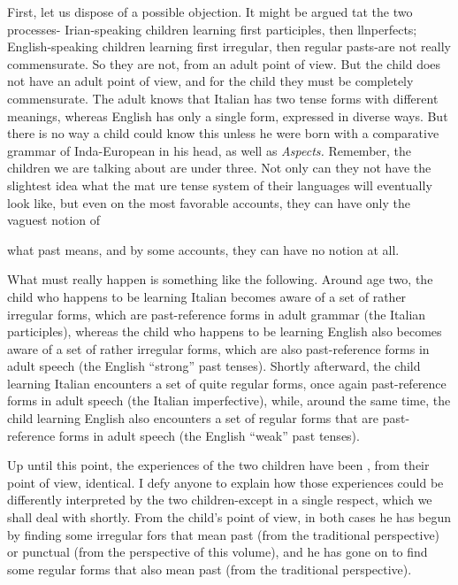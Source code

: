 First, let us dispose of a possible objection. It might be argued tat the two processes- Irian-speaking children learning first parti\-ciples, then llnperfects; English-speaking children learning first irregular, then regular pasts{}-are not really commensurate. So they are not, from an adult point of view. But the child does not have an adult point of view, and for the child they must be completely commen\-surate. The adult knows that Italian has two tense forms with different meanings, whereas English has only a single form, expressed in diverse ways. But there is no way a child could know this unless he were born with a comparative grammar of Inda-European in his head, as well as \textit{Aspects. }Remember, the children we are talking about are under three. Not only can they not have the slightest idea what the mat ure tense system of their languages will eventually look like, but even on the most favorable accounts, they can have only the vaguest notion of

what past means, and by some accounts, they can have no notion at all.


What must really happen is something like the following. Around age two, the child who happens to be learning Italian becomes aware of a set of rather irregular forms, which are past-reference forms in adult grammar (the Italian participles), whereas the child who happens to be learning English also becomes aware of a set of rather irregular forms, which are also past-reference forms in adult speech (the English ``strong'' past tenses). Shortly afterward, the child learning Italian encounters a set of quite regular forms, once again past-reference forms in adult speech (the Italian imperfective), while, around the same time, the child learning English also encounters a set of regular forms that are past-reference forms in adult speech (the English ``weak'' past tenses).

Up until this point, the experiences of the two children have been , from their point of view, identical. I defy anyone to explain how those experiences could be differently interpreted by the two children-except in a single respect, which we shall deal with shortly. From the child's point of view, in both cases he has begun by finding some irregular fors that mean past (from the traditional perspective) or punctual (from the perspective of this volume), and he has gone on to find some regular forms that also mean past (from the traditional perspective).

